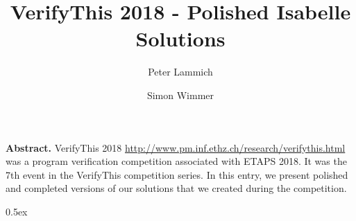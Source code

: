 \documentclass[11pt,a4paper]{book}
\begin{document}
\title{VerifyThis 2018 - Polished Isabelle Solutions}
\author{Peter Lammich \and Simon Wimmer}
\maketitle

\begin{trivlist}
\item \textbf{Abstract.}
  VerifyThis 2018 \url{http://www.pm.inf.ethz.ch/research/verifythis.html}
was a program verification competition associated with
ETAPS 2018. It was the 7th event in the VerifyThis competition series.
In this entry, we present polished and completed versions of our solutions that we
created during the competition.
\end{trivlist}

\tableofcontents

\parindent 0pt\parskip 0.5ex



%
%
\end{document}
